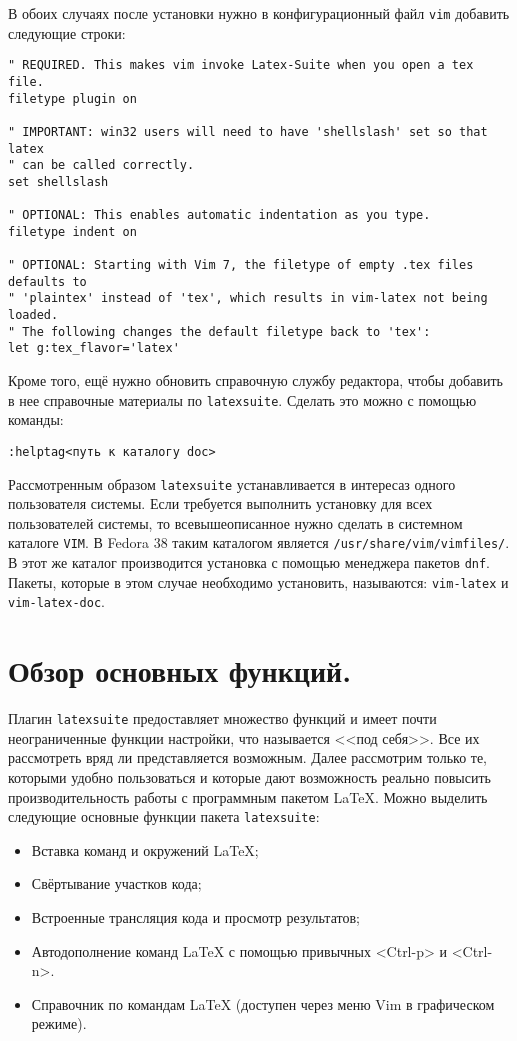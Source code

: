 \documentclass[a4paper]{article}
\begin{document}
В обоих случаях после установки нужно в 
конфигурационный файл \texttt{vim} добавить следующие строки:
\begin{verbatim}
" REQUIRED. This makes vim invoke Latex-Suite when you open a tex file.
filetype plugin on

" IMPORTANT: win32 users will need to have 'shellslash' set so that latex
" can be called correctly.
set shellslash

" OPTIONAL: This enables automatic indentation as you type.
filetype indent on

" OPTIONAL: Starting with Vim 7, the filetype of empty .tex files defaults to
" 'plaintex' instead of 'tex', which results in vim-latex not being loaded.
" The following changes the default filetype back to 'tex':
let g:tex_flavor='latex'
\end{verbatim}

Кроме того, ещё нужно обновить справочную службу редактора, чтобы добавить
в нее справочные материалы по \texttt{latexsuite}. Сделать это можно с помощью
команды:
\begin{verbatim}
:helptag<путь к каталогу doc>
\end{verbatim}

Рассмотренным образом \texttt{latexsuite} устанавливается в интересаз одного пользователя системы.
Если требуется выполнить установку для всех пользователей системы, то всевышеописанное нужно 
сделать в системном каталоге \texttt{VIM}. В Fedora 38 таким каталогом является
\texttt{/usr/share/vim/vimfiles/}. В этот же каталог производится установка с помощью менеджера
пакетов \texttt{dnf}. Пакеты, которые в этом случае необходимо установить, называются: 
\texttt{vim-latex} и \texttt{vim-latex-doc}.
\part{Обзор основных функций.}\label{part:main-functions}
Плагин \texttt{latexsuite} предоставляет множество функций и имеет почти
неограниченные функции настройки, что называется <<под себя>>. Все их
рассмотреть вряд ли представляется возможным. Далее рассмотрим только те,
которыми удобно пользоваться и которые дают возможность реально 
повысить производительность работы с программным пакетом \LaTeX.
Можно выделить следующие основные функции пакета \texttt{latexsuite}:
\begin{itemize}
	\item Вставка команд и окружений \LaTeX;
	\item Свёртывание участков кода;
	\item Встроенные трансляция кода и просмотр результатов;
	\item Автодополнение команд \LaTeX{} с помощью привычных <Ctrl-p> и <Ctrl-n>.
	\item Справочник по командам \LaTeX{} (доступен через меню Vim в графическом режиме).
\end{itemize}
\end{document}
